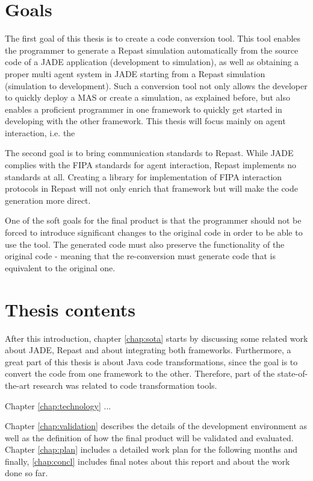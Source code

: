 \section{Goals}
The first goal of this thesis is to create a code conversion tool. This tool enables the programmer to generate a Repast simulation automatically from the source code of a JADE application (development to simulation), as well as obtaining a proper multi agent system in JADE starting from a Repast simulation (simulation to development). Such a conversion tool not only allows the developer to quickly deploy a MAS or create a simulation, as explained before, but also enables a proficient programmer in one framework to quickly get started in developing with the other framework. This thesis will focus mainly on agent interaction, i.e. the 

The second goal is to bring communication standards to Repast. While JADE complies with the FIPA standards for agent interaction, Repast implements no standards at all. Creating a library for implementation of FIPA interaction protocols in Repast will not only enrich that framework but will make the code generation more direct.

One of the soft goals for the final product is that the programmer should not be forced to introduce significant changes to the original code in order to be able to use the tool. The generated code must also preserve the functionality of the original code - meaning that the re-conversion must generate code that is equivalent to the original one.
 

\section{Thesis contents} \label{sec:struct}

After this introduction, chapter \ref{chap:sota} starts by discussing some related work about JADE, Repast and about integrating both frameworks. Furthermore, a great part of this thesis is about Java code transformations, since the goal is to convert the code from one framework to the other.
Therefore, part of the state-of-the-art research was related to code
transformation tools.

Chapter \ref{chap:technology} ...

Chapter \ref{chap:validation} describes the details of the development environment as well as the definition of how the final product will be validated and evaluated. Chapter \ref{chap:plan} includes a detailed work plan for the following months
and finally, \ref{chap:concl} includes final notes about this report and about
the work done so far.